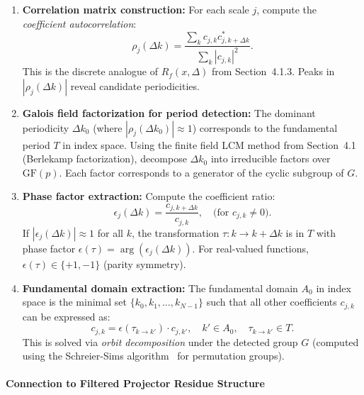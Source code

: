 \begin{enumerate}
\item \textbf{Correlation matrix construction:} For each scale $j$, compute the \emph{coefficient autocorrelation}:
\[
\rho_j(\Delta k) = \frac{\sum_k c_{j,k} c_{j,k+\Delta k}^*}{\sum_k |c_{j,k}|^2}.
\]
This is the discrete analogue of $R_f(x, \Delta)$ from Section~4.1.3. Peaks in $|\rho_j(\Delta k)|$ reveal candidate periodicities.

\item \textbf{Galois field factorization for period detection:} The dominant periodicity $\Delta k_0$ (where $|\rho_j(\Delta k_0)| \approx 1$) corresponds to the fundamental period $T$ in index space. Using the finite field LCM method from Section~4.1 (Berlekamp factorization), decompose $\Delta k_0$ into irreducible factors over $\mathrm{GF}(p)$. Each factor corresponds to a generator of the cyclic subgroup of $G$.

\item \textbf{Phase factor extraction:} Compute the coefficient ratio:
\[
\epsilon_j(\Delta k) = \frac{c_{j,k+\Delta k}}{c_{j,k}}, \quad \text{(for } c_{j,k} \neq 0\text{)}.
\]
If $|\epsilon_j(\Delta k)| \approx 1$ for all $k$, the transformation $\tau: k \to k + \Delta k$ is in $T$ with phase factor $\epsilon(\tau) = \arg(\epsilon_j(\Delta k))$. For real-valued functions, $\epsilon(\tau) \in \{+1, -1\}$ (parity symmetry).

\item \textbf{Fundamental domain extraction:} The fundamental domain $A_0$ in index space is the minimal set $\{k_0, k_1, \ldots, k_{N-1}\}$ such that all other coefficients $c_{j,k}$ can be expressed as:
\[
c_{j,k} = \epsilon(\tau_{k \to k'}) \cdot c_{j,k'}, \quad k' \in A_0, \quad \tau_{k \to k'} \in T.
\]
This is solved via \emph{orbit decomposition} under the detected group $G$ (computed using the Schreier-Sims algorithm~\cite{seress2003permutation} for permutation groups).
\end{enumerate}

\paragraph{Connection to Filtered Projector Residue Structure}

